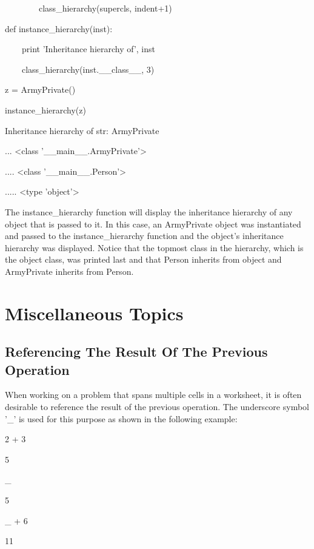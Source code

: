\documentclass[12pt,oneside]{book}
\begin{document}
\ \ \ \ \ \ \ \ class\_hierarchy(supercls, indent+1)


def instance\_hierarchy(inst):

\ \ \ \ print 'Inheritance hierarchy of', inst

\ \ \ \ class\_hierarchy(inst.\_\_class\_\_, 3)


z = ArmyPrivate()


instance\_hierarchy(z)

{\textbar}

Inheritance hierarchy of str: ArmyPrivate

... {\textless}class '\_\_main\_\_.ArmyPrivate'{\textgreater}

.... {\textless}class '\_\_main\_\_.Person'{\textgreater}

..... {\textless}type 'object'{\textgreater}

The instance\_hierarchy function will display the inheritance hierarchy of any object that is passed to it. In this case, an ArmyPrivate object was instantiated and passed to the instance\_hierarchy function and the object's inheritance hierarchy was displayed. Notice that the topmost class in the hierarchy, which is the object class, was printed last and that Person inherits from object and ArmyPrivate inherits from Person. 


\chapter[Miscellaneous Topics]{Miscellaneous Topics}

\section[Referencing The Result Of The Previous Operation]{Referencing The Result Of The Previous Operation}

When working on a problem that spans multiple cells in a worksheet, it is often desirable to reference the result of the previous operation. The underscore symbol '\_' is used for this purpose as shown in the following example: 

2 + 3

{\textbar}

5

\_

{\textbar}

5


\_ + 6

{\textbar}

11
\end{document}
